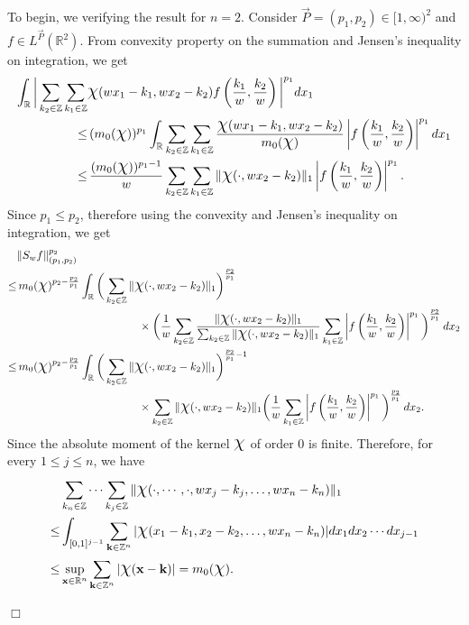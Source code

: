 \documentclass[11pt, a4paper]{article}
\theoremstyle{definition}
\newcommand{\qedwhite}{\hfill \ensuremath{\Box}}
\renewenvironment{proof}{{\raggedright \bfseries Proof.}}{\qedwhite}
\numberwithin{equation}{section}
\def\ZZ{\mathbb Z}
\def\RR{\mathbb R}
\def\Chi{\mbox{\Large$\chi$}}
\begin{document}
\begin{proof}
    To begin, we verifying the result for $n=2.$ Consider $ \overrightarrow{P}=(p_1,p_2) \in [1,\infty)^2$ and $ f \in L^{\overrightarrow{P}}(\RR^{2}).$
    From convexity property on the summation and Jensen's inequality on integration, we get 
    \begin{align*}
		\int_{\RR} \bigg|\sum_{k_2 \in \ZZ}\sum_{k_1 \in \ZZ}  &\Chi(wx_1-k_1,wx_2-k_2) f\left(\frac{k_1}{w},\frac{k_2}{w}\right)\bigg|^{p_1}dx_1\\
		\leq &\,(m_{0}(\Chi))^{p_1}\int_{\RR} \sum_{k_2 \in \ZZ}\sum_{k_1 \in \ZZ} \frac{\Chi(wx_1-k_1,wx_2-k_2)}{m_{0}(\Chi)} \left| f\left(\frac{k_1}{w},\frac{k_2}{w}\right)\right|^{p_1} dx_1\\
		\leq &\, \frac{(m_{0}(\Chi))^{p_1-1}}{w}\sum_{k_2 \in \ZZ}\sum_{k_1 \in \ZZ} \|\Chi(\cdot,wx_2-k_2)\|_1 \left| f\left(\frac{k_1}{w},\frac{k_2}{w}\right)\right|^{p_1}.
    \end{align*}
    Since $p_1\leq p_2$, therefore using the convexity and Jensen's inequality on integration, we get
    \begin{align*}
		&\|S_wf\|_{(p_1,p_2)}^{p_2}\\
		\leq&\, m_{0}(\Chi)^{p_2-\frac{p_2}{p_1}} \int_{\RR} \bigg(\sum_{k_2 \in \ZZ} \|\Chi(\cdot,wx_{2}-k_2)\|_1\bigg)^{\frac{p_2}{p_1}} \\
		&\hspace{1.5in}\times  \bigg(\frac{1}{w} \sum_{k_2 \in \ZZ}\frac{\|\Chi(\cdot,wx_{2}-k_2)\|_1}{\sum_{k_2 \in \ZZ} \|\Chi(\cdot,wx_{2}-k_2)\|_1} \sum_{k_1 \in \ZZ}\left| f\left(\frac{k_1}{w},\frac{k_2}{w}\right)\right|^{p_1}\bigg)^{\frac{p_2}{p_1}}\, dx_2\\
		\leq &\, m_{0}(\Chi)^{p_2-\frac{p_2}{p_1}}\int_{\RR} \bigg(\sum_{k_2 \in \ZZ} \|\Chi(\cdot,wx_{2}-k_2)\|_1\bigg)^{\frac{p_2}{p_1}-1}\\
		&\hspace{1.5in}\times \sum_{k_2 \in \ZZ}\|\Chi(\cdot,wx_{2}-k_2)\|_1 \bigg( \frac{1}{w}\sum_{k_1 \in \ZZ}\left| f\left(\frac{k_1}{w},\frac{k_2}{w}\right)\right|^{p_1}\bigg)^{\frac{p_2}{p_1}}\, dx_2.
    \end{align*}
    Since the absolute moment of the kernel $\Chi$ of order $0$ is finite. Therefore, for every $1\leq j\leq n$, we have
    \begin{align*}
    	&\sum_{k_{n} \in \ZZ} \cdots \sum_{k_j \in \ZZ} \|\Chi(\cdot,\cdots,\cdot,wx_{j}-k_j,\dots, wx_n-k_n)\|_{1}\\
    	\leq& \int_{[0,1]^{j-1}} \sum_{\textbf{k}\in \ZZ^n} |\Chi(x_1-k_1,x_2-k_2,\dots,wx_n-k_n)|dx_1dx_2\cdots dx_{j-1}\\
    	\leq& \sup_{\textbf{x}\in \RR^n} \sum_{\textbf{k}\in \ZZ^n} |\Chi(\textbf{x}-\textbf{k})|=m_0(\Chi).
    \end{align*}
    

\end{proof}
\end{document}
